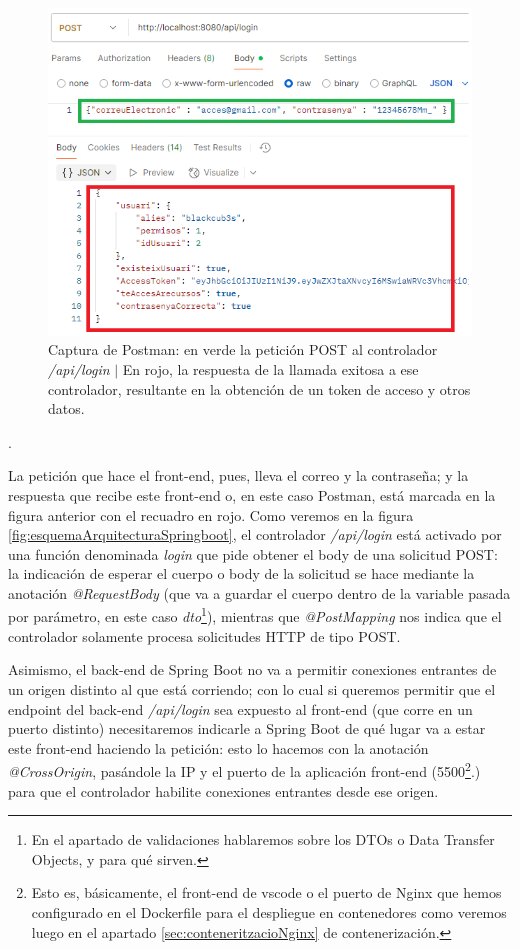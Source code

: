 \documentclass[a4paper,12pt]{report}
\begin{document}
				
				\FloatBarrier
				\begin{figure}[H]
					\centering
					\caption{Captura de Postman: en verde la petición POST al controlador \textit{/api/login} $|$ En rojo, la respuesta de la llamada exitosa a ese controlador, resultante en la obtención de un token de acceso y otros datos.}
					\includegraphics[width=1\linewidth]{img/apiLoginSpringBoot}

					\label{fig:apiloginspringboot}
				\end{figure}
				\FloatBarrier


.


				La petición que hace el front-end, pues, lleva el correo y la contraseña; y la respuesta que recibe este front-end o, en este caso Postman, está marcada en la figura anterior con el recuadro en rojo. Como veremos en la figura \ref{fig:esquemaArquitecturaSpringboot}, el controlador \textit{/api/login} está activado por una función denominada \textit{login} que pide obtener el body de una solicitud POST: la indicación de esperar el cuerpo o body de la solicitud se hace mediante la anotación \textit{@RequestBody} (que va a guardar el cuerpo dentro de la variable pasada por parámetro, en este caso \textit{dto}\footnote{En el apartado de validaciones hablaremos sobre los DTOs o Data Transfer Objects, y para qué sirven.}), mientras que \textit{@PostMapping} nos indica que el controlador solamente procesa solicitudes HTTP de tipo POST.
				
				Asimismo, el back-end de Spring Boot no va a permitir conexiones entrantes de un origen distinto al que está corriendo; con lo cual si queremos permitir que el endpoint del back-end \textit{/api/login} sea expuesto al front-end (que corre en un puerto distinto) necesitaremos indicarle a Spring Boot de qué lugar va a estar este front-end haciendo la petición: esto lo hacemos con la anotación \textit{@CrossOrigin}, pasándole la IP y el puerto de la aplicación front-end (5500\footnote{Esto es, básicamente, el front-end de vscode o el puerto de Nginx que hemos configurado en el Dockerfile para el despliegue en contenedores como veremos luego en el apartado \ref{sec:conteneritzacioNginx} de contenerización.}.) para que el controlador habilite conexiones entrantes desde ese origen.
				
\end{document}
